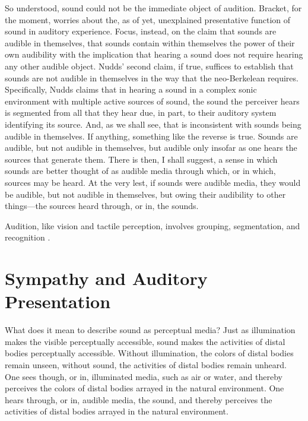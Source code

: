 So understood, sound could not be the immediate object of audition. Bracket, for the moment, worries about the, as of yet, unexplained presentative function of sound in auditory experience. Focus, instead, on the claim that sounds are audible in themselves, that sounds contain within themselves the power of their own audibility with the implication that hearing a sound does not require hearing any other audible object. Nudds' second claim, if true, suffices to establish that sounds are not audible in themselves in the way that the neo-Berkelean requires. Specifically, Nudds claims that in hearing a sound in a complex sonic environment with multiple active sources of sound, the sound the perceiver hears is segmented from all that they hear due, in part, to their auditory system identifying its source. And, as we shall see, that is inconsistent with sounds being audible in themselves. If anything, something like the reverse is true. Sounds are audible, but not audible in themselves, but audible only insofar as one hears the sources that generate them. There is then, I shall suggest, a sense in which sounds are better thought of as audible media through which, or in which, sources may be heard. At the very lest, if sounds were audible media, they would be audible, but not audible in themselves, but owing their audibility to other things---the sources heard through, or in, the sounds.

Audition, like vision and tactile perception, involves grouping, segmentation, and recognition \citep{Bregman:1990aa}.




\section{Sympathy and Auditory Presentation} %
\label{sec:sympathy_and_auditory_presentation}

What does it mean to describe sound as perceptual media? Just as illumination makes the visible perceptually accessible, sound makes the activities of distal bodies perceptually accessible. Without illumination, the colors of distal bodies remain unseen, without sound, the activities of distal bodies remain unheard. One sees though, or in, illuminated media, such as air or water, and thereby perceives the colors of distal bodies arrayed in the natural environment. One hears through, or in, audible media, the sound, and thereby perceives the activities of distal bodies arrayed in the natural environment.

